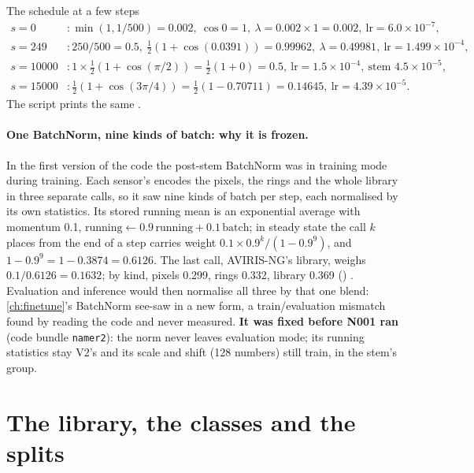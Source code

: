 \begin{worked}[label={we:namer:lr}]{The schedule at a few steps}
\begin{align*}
s=0 &: \min(1,1/500)=0.002,\ \cos0=1,\ \lambda=0.002\times1=0.002,\ \text{lr}=6.0\times10^{-7},\\
s=249 &: 250/500=0.5,\ \tfrac12(1+\cos(0.0391))=0.99962,\ \lambda=0.49981,\ \text{lr}=1.499\times10^{-4},\\
s=10000 &: 1\times\tfrac12(1+\cos(\pi/2))=\tfrac12(1+0)=0.5,\ \text{lr}=1.5\times10^{-4},\ \text{stem }4.5\times10^{-5},\\
s=15000 &: \tfrac12(1+\cos(3\pi/4))=\tfrac12(1-0.70711)=0.14645,\ \text{lr}=4.39\times10^{-5}.
\end{align*}
The script prints the same \tagC.
\end{worked}

\paragraph{One BatchNorm, nine kinds of batch: why it is frozen.} In the first version of the code the post-stem
BatchNorm was in training mode during training. Each sensor's  encodes the pixels, the rings and the whole
library in three separate calls, so it saw nine kinds of batch per step, each normalised by its own statistics. Its
stored running mean is an exponential average with momentum 0.1, $\text{running}\leftarrow0.9\,\text{running}+0.1\,
\text{batch}$; in steady state the call $k$ places from the end of a step carries weight $0.1\times0.9^k/(1-0.9^9)$,
and $1-0.9^9=1-0.3874=0.6126$. The last call, AVIRIS-NG's library, weighs $0.1/0.6126=0.1632$; by kind, pixels 0.299,
rings 0.332, library 0.369 () \tagC. Evaluation and
inference would then normalise all three by that one blend: \cref{ch:finetune}'s BatchNorm see-saw in a new form, a
train/evaluation mismatch found by reading the code and never measured. \textbf{It was fixed before N001 ran} (code
bundle \texttt{namer2}): the norm never leaves evaluation mode; its running statistics stay V2's and its scale and shift
(128 numbers) still train, in the stem's group.

\section{The library, the classes and the splits}\label{sec:namer:splits}

